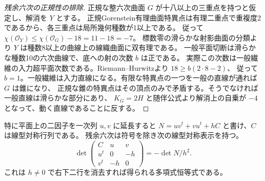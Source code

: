 \begin{proof}[残余六次の正規性の排除]
正規な整六次曲面 $G$ が十八以上の三重点を持つと仮定し、解消を $Y$ とする。
正規Gorenstein有理曲面特異点は有理二重点で重複度2であるから、各三重点は局所幾何種数が1以上である。
従って $\chi(\mathcal O_Y)\le\chi(\mathcal O_G)-18=11-18=-7$。
標数零の滑らかな射影曲面の分類より $Y$ は種数8以上の曲線上の線織曲面に双有理である。
一般平面切断は滑らかな種数10の六次曲線で、底への射の次数 $b$ は正である。
実際この次数は一般繊維の入力超平面次数である。Riemann--Hurwitzより $18\ge b(2\cdot8-2)$、
従って $b=1$。一般繊維は入力直線になる。有限な特異点の一つを一般の直線が通れば $G$ は錐になり、
正規な錐の特異点はその頂点のみで矛盾する。そうでなければ一般直線は滑らかな部分にあり、
$K_G=2H$ と随伴公式より解消上の自乗が $-4$ となって、動く直線であることに反する。
\end{proof}

特に平面上の二因子を一次列 $u,v$ に延長すると $N=uv^t+vu^t+hC$ と書け、$C$ は線型対称行列である。
残余六次は符号を除き次の線型対称表示を持つ。
\[
\det\begin{pmatrix}C&u&v\\ u^t&0&-h\\ v^t&-h&0\end{pmatrix}
                 =-\det N/h^2 .
\]
これは $h\ne0$ で右下二行を消去すれば得られる多項式恒等式である。
